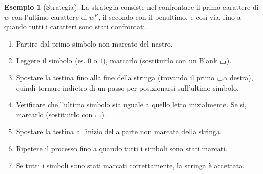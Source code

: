 \documentclass[a4paper]{article}
\theoremstyle{definition} %
\newtheorem{example}{Esempio}
\newcommand{\blankS}{\ensuremath{\raisebox{-0.15ex}{\scalebox{1.3}[0.7]{$\sqcup$}}}}
\begin{document}
\begin{example}[Strategia]
La strategia consiste nel confrontare il primo carattere di $w$ con l'ultimo carattere di $w^R$, il secondo con il penultimo, e così via, fino a quando tutti i caratteri sono stati confrontati.
\begin{enumerate}
    \item Partire dal primo simbolo non marcato del nastro.
    \item Leggere il simbolo (es. $0$ o $1$), marcarlo (sostituirlo con un Blank $\blankS$).
    \item Spostare la testina fino alla fine della stringa (trovando il primo \blankS a destra), quindi tornare indietro di un passo per posizionarsi sull'ultimo simbolo.
    \item Verificare che l'ultimo simbolo sia uguale a quello letto inizialmente. Se sì, marcarlo (sostituirlo con \blankS).
    \item Spostare la testina all'inizio della parte non marcata della stringa.
    \item Ripetere il processo fino a quando tutti i simboli sono stati marcati.
    \item Se tutti i simboli sono stati marcati correttamente, la stringa è accettata.
\end{enumerate}
\end{example}

\end{document}
